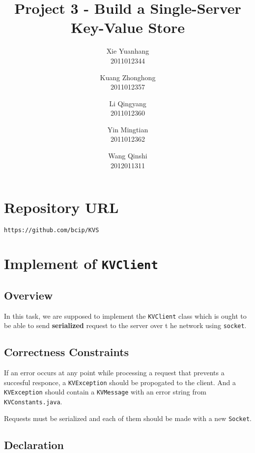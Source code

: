 \documentclass{article}
\title{Project 3 - Build a Single-Server Key-Value Store}
\author{
Xie Yuanhang  \\   2011012344\and
Kuang Zhonghong  \\   2011012357\and
Li Qingyang   \\   2011012360 \and
Yin Mingtian   \\   2011012362\and
Wang Qinshi   \\   2012011311}
\date{}
\begin{document}
\maketitle

\setcounter{section}{-1}
\section{Repository URL}
\texttt{https://github.com/bcip/KVS}

\section{Implement of \texttt{KVClient}}
\subsection{Overview}
In this task, we are supposed to implement the \texttt{KVClient} class which is ought to be able to send \textbf{serialized} request to the server
over t he network using \texttt{socket}.
\subsection{Correctness Constraints}
\begin{compactitem}
\item If an error occurs at any point while processing a request that prevents a succesful responce, a \texttt{KVException} should be propogated 
	to the client. And a \texttt{KVException} should contain a \texttt{KVMessage} with an error string from \texttt{KVConstants.java}.
\item Requests must be serialized and each of them should be made with a new \texttt{Socket}.
\end{compactitem}
\subsection{Declaration}
\end{document}
